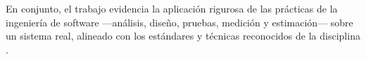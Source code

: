 \documentclass[stu,11pt,floatsintext]{apa7}
\begin{document}
\noindent En conjunto, el trabajo evidencia la aplicación rigurosa de las prácticas de la
ingeniería de software —análisis, diseño, pruebas, medición y estimación— sobre un
sistema real, alineado con los estándares y técnicas reconocidos de la disciplina
\parencite{sommerville2011,pressman2014,iso25010,ieee829}.

\newpage
\printbibliography[title=Referencias]
\end{document}

